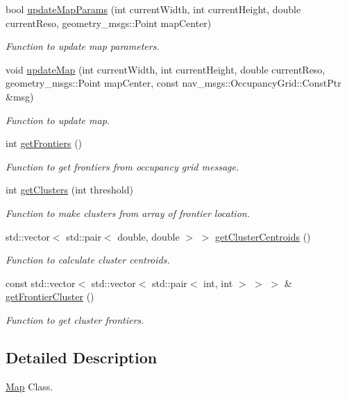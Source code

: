 \begin{DoxyCompactItemize}
bool \hyperlink{classMap_aca7b17a488149e73990e12f6ec506f23}{update\+Map\+Params} (int current\+Width, int current\+Height, double current\+Reso, geometry\+\_\+msgs\+::\+Point map\+Center)
\begin{DoxyCompactList}\small\item\em Function to update map parameters. \end{DoxyCompactList}\item 
void \hyperlink{classMap_a4feacf5e0ca0961dc48dbdf7b7f42dd8}{update\+Map} (int current\+Width, int current\+Height, double current\+Reso, geometry\+\_\+msgs\+::\+Point map\+Center, const nav\+\_\+msgs\+::\+Occupancy\+Grid\+::\+Const\+Ptr \&msg)
\begin{DoxyCompactList}\small\item\em Function to update map. \end{DoxyCompactList}\item 
int \hyperlink{classMap_a707c9abbd2a2458c3fe885cf0d021906}{get\+Frontiers} ()
\begin{DoxyCompactList}\small\item\em Function to get frontiers from occupancy grid message. \end{DoxyCompactList}\item 
int \hyperlink{classMap_a18c425e2b087e715cb822af6ad8d99cc}{get\+Clusters} (int threshold)
\begin{DoxyCompactList}\small\item\em Function to make clusters from array of frontier location. \end{DoxyCompactList}\item 
std\+::vector$<$ std\+::pair$<$ double, double $>$ $>$ \hyperlink{classMap_ae2ff0d03880d709d140ed5b72166841b}{get\+Cluster\+Centroids} ()
\begin{DoxyCompactList}\small\item\em Function to calculate cluster centroids. \end{DoxyCompactList}\item 
const std\+::vector$<$ std\+::vector$<$ std\+::pair$<$ int, int $>$ $>$ $>$ \& \hyperlink{classMap_a4dc9d7e239d1bd24f2906331a4ef0cec}{get\+Frontier\+Cluster} ()
\begin{DoxyCompactList}\small\item\em Function to get cluster frontiers. \end{DoxyCompactList}\end{DoxyCompactItemize}


\subsection{Detailed Description}
\hyperlink{classMap}{Map} Class. 

